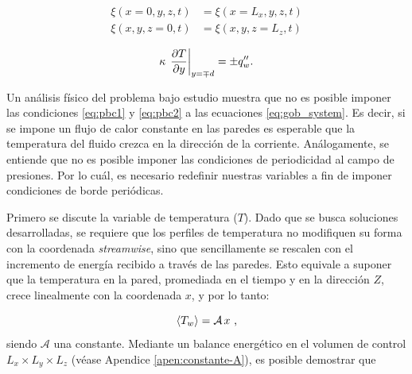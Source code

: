 \begin{align}
\xi(x=0,y,z,t) &= \xi(x=L_x,y,z,t)
\label{eq:pbc1} \\
\xi(x,y,z=0,t) &= \xi(x,y,z=L_z,t)
\label{eq:pbc2}
\end{align}

\begin{equation}
\kappa \hspace{0.5mm} \left. \frac{\partial T}{\partial y} \right\vert_{y=\mp d} = \pm q''_w \text{.}
\label{eq:neumann}
\end{equation}

%
%

Un análisis físico del problema bajo estudio muestra que no es posible imponer las condiciones \ref{eq:pbc1} y \ref{eq:pbc2} a las ecuaciones \ref{eq:gob_system}. Es decir, si se impone un flujo de calor constante en las paredes es esperable que la temperatura del fluido crezca en la dirección de la corriente. Análogamente, se entiende que no es posible imponer las condiciones de periodicidad al campo de presiones. Por lo cuál, es necesario redefinir nuestras variables a fin de imponer condiciones de borde periódicas.

Primero se discute la variable de temperatura ($T$). Dado que se busca soluciones desarrolladas, se requiere que  los perfiles de temperatura no modifiquen su forma con la coordenada \textit{streamwise}, sino que sencillamente se rescalen con el incremento de energía recibido a través de las paredes. Esto equivale a suponer que la temperatura en la pared, promediada en el tiempo y en la dirección $Z$, crece linealmente con la coordenada $x$, y por lo tanto: 

$$
\langle T_w \rangle = \mathcal{A} \hspace{0.5mm} x \text{ ,}
$$
siendo $\mathcal{A}$ una constante. Mediante un balance energético en el volumen de control $L_x \times L_y \times L_z$ (véase Apendice \ref{apen:constante-A}), es posible demostrar que

